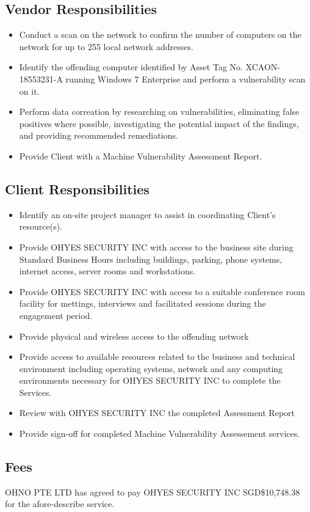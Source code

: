 \documentclass[11pt, oneside]{article}   	%
\newcommand{\myName}{OHYES SECURITY INC}
\newcommand{\clientName}{OHNO PTE LTD}
\newcommand{\projectCosting}{SGD\$10,748.38}
\begin{document}
\subsection{Vendor Responsibilities}
\begin{itemize}
\item{
	Conduct a scan on the network to confirm the number of computers
	on the network for up to 255 local network addresses.
}
\item{
	Identify the offending computer identified by Asset Tag No.
	XCAON-18553231-A running Windows 7 Enterprise and perform
	a vulnerability scan on it.
}
\item {
	Perform data correation by researching on vulnerabilities,
	eliminating false positives where possible, investigating
	the potential impact of the findings, and providing recommended
	remediations.
}
\item{
	Provide Client with a Machine Vulnerability Assessment Report.
}
\end{itemize}
\subsection{Client Responsibilities}
\begin{itemize}
\item {
	Identify an on-site project manager to assist in coordinating 
	Client's resource(s).
}
\item{
	Provide \myName{} with access to the business site during
	Standard Business Hours including buildings, parking, phone systems,
	internet access, server rooms and workstations.
}
\item{
	Provide \myName{} with access to a suitable conference room 
	facility for mettings, interviews and facilitated sessions during 
	the engagement period.
}
\item{
	Provide physical and wireless access to the offending network
}
\item{
	Provide access to available resources related to the business
	and technical environment including operating systems, network
	and any computing environments necessary for \myName{} to
	complete the Services.
}
\item{
	Review with \myName{} the completed Assessment Report
}
\item{
	Provide sign-off for completed Machine Vulnerability Assessement
	services.
}

\end{itemize}

\subsection{Fees}
\clientName{} has agreed to pay \myName{} \projectCosting{} for the
afore-describe service.
\end{document}
